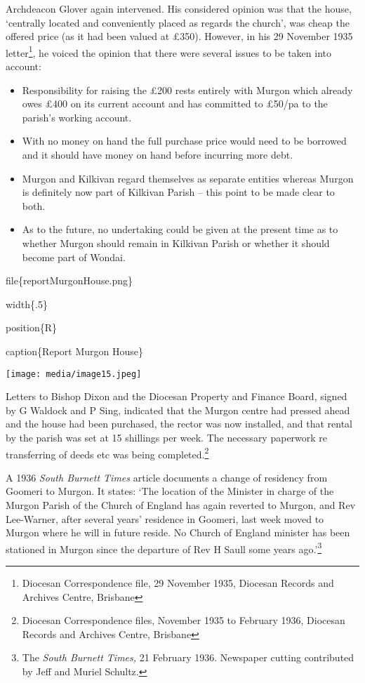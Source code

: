 Archdeacon Glover again intervened. His considered opinion was that the
house, `centrally located and conveniently placed as regards the
church', was cheap the offered price (as it had been valued at £350).
However, in his 29 November 1935 letter\footnote{Diocesan Correspondence
  file, 29 November 1935, Diocesan Records and Archives Centre, Brisbane},
he voiced the opinion that there were several issues to be taken into
account:

\begin{itemize}
\item
  Responsibility for raising the £200 rests entirely with Murgon which
  already owes £400 on its current account and has committed to £50/pa
  to the parish's working account.
\item
  With no money on hand the full purchase price would need to be
  borrowed and it should have money on hand before incurring more debt.
\item
  Murgon and Kilkivan regard themselves as separate entities whereas
  Murgon is definitely now part of Kilkivan Parish -- this point to be
  made clear to both.
\item
  As to the future, no undertaking could be given at the present time as
  to whether Murgon should remain in Kilkivan Parish or whether it
  should become part of Wondai.
\end{itemize}

file\{reportMurgonHouse.png\}

width\{.5\}

position\{R\}

caption\{Report Murgon House\}

\texttt{[image: media/image15.jpeg]}

Letters to Bishop Dixon and the Diocesan Property and Finance Board,
signed by G Waldock and P Sing, indicated that the Murgon centre had
pressed ahead and the house had been purchased, the rector was now
installed, and that rental by the parish was set at 15 shillings per
week. The necessary paperwork re transferring of deeds etc was being
completed.\footnote{Diocesan Correspondence files, November 1935 to
  February 1936, Diocesan Records and Archives Centre, Brisbane}

A 1936 \emph{South Burnett Times} article documents a change of
residency from Goomeri to Murgon. It states: `The location of the
Minister in charge of the Murgon Parish of the Church of England has
again reverted to Murgon, and Rev Lee-Warner, after several years'
residence in Goomeri, last week moved to Murgon where he will in future
reside. No Church of England minister has been stationed in Murgon since
the departure of Rev H Saull some years ago.'\footnote{The \emph{South
  Burnett Times,} 21 February 1936. Newspaper cutting contributed by
  Jeff and Muriel Schultz.}

